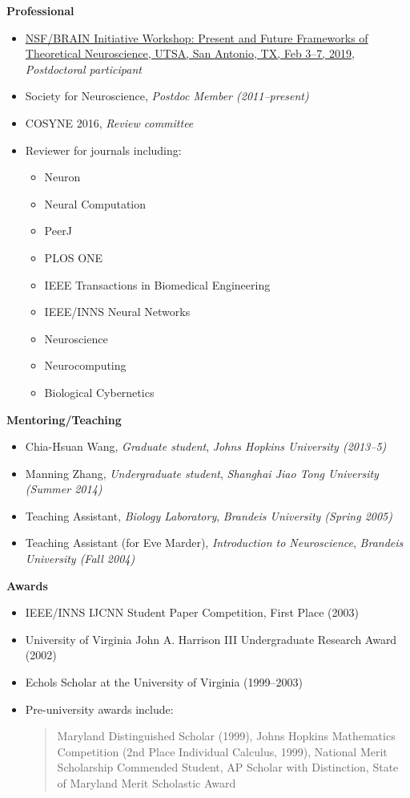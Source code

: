 \documentclass[10pt]{article}
\begin{document}
\pagebreak

{\large \textbf{Professional}}
\begin{itemize}
    \item \href{https://www.utsa.edu/SantamariaLab/Workshop/index.html}{NSF/BRAIN Initiative Workshop: Present and Future Frameworks of Theoretical Neuroscience, UTSA, San Antonio, TX, Feb 3--7, 2019}, \emph{Postdoctoral participant}
    \item Society for Neuroscience, \emph{Postdoc Member (2011--present)}
    \item COSYNE 2016, \emph{Review committee}
    \item Reviewer for journals including:
    \begin{itemize}
        \item Neuron
        \item Neural Computation
        \item PeerJ
        \item PLOS ONE
        \item IEEE Transactions in Biomedical Engineering
        \item IEEE/INNS Neural Networks
        \item Neuroscience
        \item Neurocomputing
        \item Biological Cybernetics
    \end{itemize}
\end{itemize}

{\large \textbf{Mentoring/Teaching}}
\begin{itemize}
  \item Chia-Hsuan Wang, \emph{Graduate student}, \emph{Johns Hopkins University (2013--5)}
  \item Manning Zhang, \emph{Undergraduate student}, \emph{Shanghai Jiao Tong University (Summer 2014)}
  \item Teaching Assistant, \emph{Biology Laboratory}, \emph{Brandeis University (Spring 2005)}
  \item Teaching Assistant (for Eve Marder), \emph{Introduction to Neuroscience}, \emph{Brandeis University (Fall 2004)}
\end{itemize}

{\large \textbf{Awards}}
\begin{itemize}
  \item IEEE/INNS IJCNN Student Paper Competition, First Place (2003)
  \item University of Virginia John A. Harrison III Undergraduate Research Award (2002)
  \item Echols Scholar at the University of Virginia (1999--2003)
  \item Pre-university awards include:
\begin{quote}
Maryland Distinguished Scholar (1999), Johns Hopkins Mathematics Competition (2nd Place Individual Calculus, 1999), National Merit Scholarship Commended Student, AP Scholar with Distinction, State of Maryland Merit Scholastic Award
\end{quote}
\end{itemize}
\end{document}
